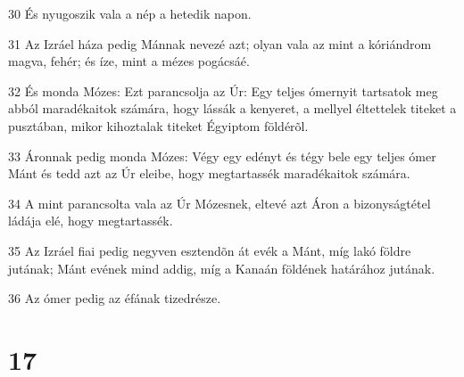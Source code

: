 \par 30 És nyugoszik vala a nép a hetedik napon.
\par 31 Az Izráel háza pedig Mánnak nevezé azt; olyan vala az mint a kóriándrom magva, fehér; és íze, mint a mézes pogácsáé.
\par 32 És monda Mózes: Ezt parancsolja az Úr: Egy teljes ómernyit tartsatok meg abból maradékaitok számára, hogy lássák a kenyeret, a mellyel éltettelek titeket a pusztában, mikor kihoztalak titeket Égyiptom földérõl.
\par 33 Áronnak pedig monda Mózes: Végy egy edényt és tégy bele egy teljes ómer Mánt és tedd azt az Úr eleibe, hogy megtartassék maradékaitok számára.
\par 34 A mint parancsolta vala az Úr Mózesnek, eltevé azt Áron a bizonyságtétel ládája elé, hogy megtartassék.
\par 35 Az Izráel fiai pedig negyven esztendõn át evék a Mánt, míg lakó földre jutának; Mánt evének mind addig, míg a Kanaán földének határához jutának.
\par 36 Az ómer pedig az éfának tizedrésze.

\chapter{17}

